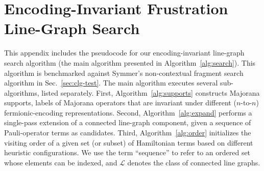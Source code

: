 \documentclass[%
 aip,
 amsmath,amssymb,
 reprint,%
]{revtex4-1}
\newcommand{\CLG}{\mathcal{L}}           %
\begin{document}

\section{Encoding-Invariant Frustration Line-Graph Search} \label{app:line-graph-alg}

This appendix includes the pseudocode for our encoding-invariant line-graph search algorithm (the main algorithm presented in Algorithm~\ref{alg:search}). This algorithm is benchmarked against Symmer's non-contextual fragment search algorithm in Sec.~\ref{sec:clg-test}. The main algorithm executes several sub-algorithms, listed separately. First, Algorithm~\ref{alg:supports} constructs Majorana supports, labels of Majorana operators that are invariant under different ($n$-to-$n$) fermionic-encoding representations. Second, Algorithm~\ref{alg:expand} performs a single-pass extension of a connected line-graph component, given a sequence of Pauli-operator terms as candidates. Third, Algorithm~\ref{alg:order} initializes the visiting order of a given set (or subset) of Hamiltonian terms based on different heuristic configurations. We use the term ``sequence'' to refer to an ordered set whose elements can be indexed, and $\CLG$ denotes the class of connected line graphs.
\end{document}
